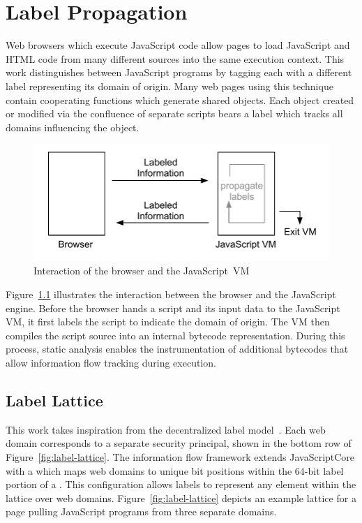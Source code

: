 
\chapter{Label Propagation}
\label{ch:label-propagation}

Web browsers which execute JavaScript code allow pages to load JavaScript and HTML code from many different sources into the same execution context.
This work distinguishes between JavaScript programs by tagging each with a different label representing its domain of origin.
Many web pages using this technique contain cooperating functions which generate shared objects.
Each object created or modified via the confluence of separate scripts bears a label which tracks all domains influencing the object.

\begin{figure}[ht]
  \centerline{\includegraphics[keepaspectratio=true]{images/browserinteraction.pdf}}
  \caption{Interaction of the browser and the JavaScript~VM}
  \label{fig:browserinteraction}
\end{figure}

Figure~\ref{fig:browserinteraction} illustrates the interaction between the browser and the JavaScript engine.
Before the browser hands a script and its input data to the JavaScript VM, it first labels the script to indicate the domain of origin.
The VM then compiles the script source into an internal bytecode representation.
During this process, static analysis enables the instrumentation of additional bytecodes that allow information flow tracking during execution.

\section{Label Lattice}
\label{sec:label-lattice}

This work takes inspiration from the decentralized label model~\cite{myers.liskov+00}.
Each web domain corresponds to a separate security principal, shown in the bottom row of Figure~\ref{fig:label-lattice}.
The information flow framework extends JavaScriptCore with a  which maps web domains to unique bit positions within the 64-bit label portion of a .
This configuration allows labels to represent any element within the lattice over web domains.
Figure~\ref{fig:label-lattice} depicts an example lattice for a page pulling JavaScript programs from three separate domains.

